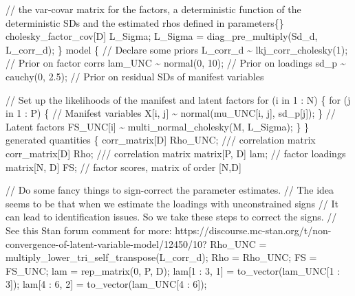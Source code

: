 \documentclass[
  letterpaper,
  DIV=11,
  numbers=noendperiod]{scrreprt}
\newenvironment{Shaded}{\begin{snugshade}}{\end{snugshade}}
\newcommand{\CommentTok}[1]{\textcolor[rgb]{0.37,0.37,0.37}{#1}}
\newcommand{\ControlFlowTok}[1]{\textcolor[rgb]{0.00,0.23,0.31}{#1}}
\newcommand{\DataTypeTok}[1]{\textcolor[rgb]{0.68,0.00,0.00}{#1}}
\newcommand{\DecValTok}[1]{\textcolor[rgb]{0.68,0.00,0.00}{#1}}
\newcommand{\FloatTok}[1]{\textcolor[rgb]{0.68,0.00,0.00}{#1}}
\newcommand{\KeywordTok}[1]{\textcolor[rgb]{0.00,0.23,0.31}{#1}}
\newcommand{\NormalTok}[1]{\textcolor[rgb]{0.00,0.23,0.31}{#1}}
\begin{document}
\begin{Shaded}
\begin{Highlighting}[]
  \CommentTok{// the var{-}covar matrix for the factors, a deterministic function of the deterministic SDs and the estimated rhos defined in parameters\{\}}
  \DataTypeTok{cholesky\_factor\_cov}\NormalTok{[D] L\_Sigma;}
\NormalTok{  L\_Sigma = diag\_pre\_multiply(Sd\_d, L\_corr\_d);}
\NormalTok{\}}
\KeywordTok{model}\NormalTok{ \{}
  \CommentTok{// Declare some priors}
\NormalTok{  L\_corr\_d \textasciitilde{} lkj\_corr\_cholesky(}\DecValTok{1}\NormalTok{); }\CommentTok{// Prior on factor corrs}
\NormalTok{  lam\_UNC \textasciitilde{} normal(}\DecValTok{0}\NormalTok{, }\DecValTok{10}\NormalTok{); }\CommentTok{// Prior on loadings}
\NormalTok{  sd\_p \textasciitilde{} cauchy(}\DecValTok{0}\NormalTok{, }\FloatTok{2.5}\NormalTok{); }\CommentTok{// Prior on residual SDs of manifest variables}
  
  \CommentTok{// Set up the likelihoods of the manifest and latent factors}
  \ControlFlowTok{for}\NormalTok{ (i }\ControlFlowTok{in} \DecValTok{1}\NormalTok{ : N) \{}
    \ControlFlowTok{for}\NormalTok{ (j }\ControlFlowTok{in} \DecValTok{1}\NormalTok{ : P) \{}
      \CommentTok{// Manifest variables}
\NormalTok{      X[i, j] \textasciitilde{} normal(mu\_UNC[i, j], sd\_p[j]);}
\NormalTok{    \}}
    \CommentTok{// Latent factors}
\NormalTok{    FS\_UNC[i] \textasciitilde{} multi\_normal\_cholesky(M, L\_Sigma);}
\NormalTok{  \}}
\NormalTok{\}}
\KeywordTok{generated quantities}\NormalTok{ \{}
  \DataTypeTok{corr\_matrix}\NormalTok{[D] Rho\_UNC; }\CommentTok{/// correlation matrix}
  \DataTypeTok{corr\_matrix}\NormalTok{[D] Rho; }\CommentTok{/// correlation matrix}
  \DataTypeTok{matrix}\NormalTok{[P, D] lam; }\CommentTok{// factor loadings}
  \DataTypeTok{matrix}\NormalTok{[N, D] FS; }\CommentTok{// factor scores, matrix of order [N,D]}
  
  \CommentTok{// Do some fancy things to sign{-}correct the parameter estimates.}
  \CommentTok{// The idea seems to be that when we estimate the loadings with unconstrained signs}
  \CommentTok{// It can lead to identification issues. So we take these steps to correct the signs.}
  \CommentTok{// See this Stan forum comment for more: https://discourse.mc{-}stan.org/t/non{-}convergence{-}of{-}latent{-}variable{-}model/12450/10?}
\NormalTok{  Rho\_UNC = multiply\_lower\_tri\_self\_transpose(L\_corr\_d);}
\NormalTok{  Rho = Rho\_UNC;}
\NormalTok{  FS = FS\_UNC;}
\NormalTok{  lam = rep\_matrix(}\DecValTok{0}\NormalTok{, P, D);}
\NormalTok{  lam[}\DecValTok{1}\NormalTok{ : }\DecValTok{3}\NormalTok{, }\DecValTok{1}\NormalTok{] = to\_vector(lam\_UNC[}\DecValTok{1}\NormalTok{ : }\DecValTok{3}\NormalTok{]);}
\NormalTok{  lam[}\DecValTok{4}\NormalTok{ : }\DecValTok{6}\NormalTok{, }\DecValTok{2}\NormalTok{] = to\_vector(lam\_UNC[}\DecValTok{4}\NormalTok{ : }\DecValTok{6}\NormalTok{]);}
  

\end{Highlighting}
\end{Shaded}
\end{document}
